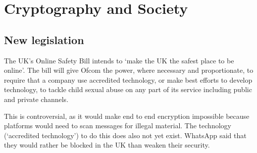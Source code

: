 \section{Cryptography and Society}

\subsection{New legislation}
The UK's Online Safety Bill intends to `make the UK the safest place to be online'. The bill will give Ofcom the power, where necessary and proportionate, to require that a company use accredited technology, or make best efforts to develop technology, to tackle child sexual abuse on any part of its service including public and private channels.

This is controversial, as it would make end to end encryption impossible because platforms would need to scan messages for illegal material. The technology (`accredited technology') to do this does also not yet exist. WhatsApp said that they would rather be blocked in the UK than weaken their security.

